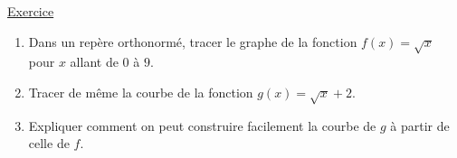 \documentclass{automatisme}
\begin{document}
\begin{frame}
	\uline{\Large Exercice}

	\begin{enumerate}
		\item Dans un repère orthonormé, tracer le graphe de la fonction $f(x) = \sqrt{x}$ pour $x$ allant de $0$ à $9$.
		\item Tracer de même la courbe de la fonction $g(x) = \sqrt{x} + 2$.
		\item Expliquer comment on peut construire facilement la courbe de $g$ à partir de celle de $f$.
	\end{enumerate}
\end{frame}
\end{document}

